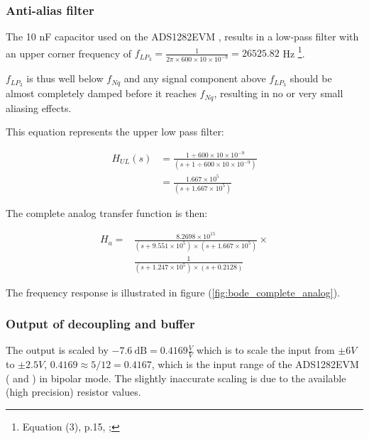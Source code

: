 \documentclass[a4paper]{article}
\begin{document}
  \begin{multicols}{2}

\subsubsection{Anti-alias filter}
The 10 nF capacitor used on the ADS1282EVM
\cite{ads1282evm_ds}, results in a low-pass filter with an upper corner frequency of $f_{LP_3} =
\frac{1}{2 \pi \times 600 \times 10 \times 10^{-9}} = 26525.82 $ Hz
\footnote{Equation (3), p.15, \cite{ads1282_ds}; }.

$f_{LP_3}$ is thus well below $f_{Nq}$ and any signal component above $f_{LP_3}$ should
be almost completely damped before it reaches $f_{Nq}$, resulting in no
or very small aliasing effects.

This equation represents the upper low pass filter:
\begin{center}
\begin{equation}
  \begin{aligned}
  H_{UL}(s) &= \frac{1 \div 600 \times 10 \times 10^{-9}}
                   {(s + 1 \div 600 \times 10 \times 10^{-9})} \\
            &= \frac{1.667 \times 10^5}{(s + 1.667 \times 10^5)}
  \end{aligned}
  \label{eqn:transfer_upper_lowpass}
\end{equation}
\end{center}

The complete analog transfer function is then:
\begin{center}
\begin{equation}
  \begin{aligned}
  H_{a} = &\frac{8.2698 \times 10^{15}}
                { (s + 9.551 \times 10^5) \times
                   (s + 1.667 \times 10^5)
                 } \times \\
          & \frac{1}
                 {(s + 1.247 \times 10^5) \times
                  (s + 0.2128) }
  \end{aligned}
  \label{eqn:transfer_analog}
\end{equation}
\end{center}


The frequency response is illustrated in figure
(\ref{fig:bode_complete_analog}).
\subsubsection{Output of decoupling and buffer} The output is scaled by $-7.6\ \text{dB} =
0.4169 \frac{V}{V}$ which is to scale the input from $\pm 6V$ to $\pm 2.5V$, $0.4169
\approx 5 / 12 = 0.4167$, which is the input range of the ADS1282EVM
(\cite{ads1282evm_ds} and \cite{ads1282_ds}) in bipolar mode. The
slightly inaccurate scaling is due to the available (high precision) resistor values.


\end{multicols}
\end{document}
